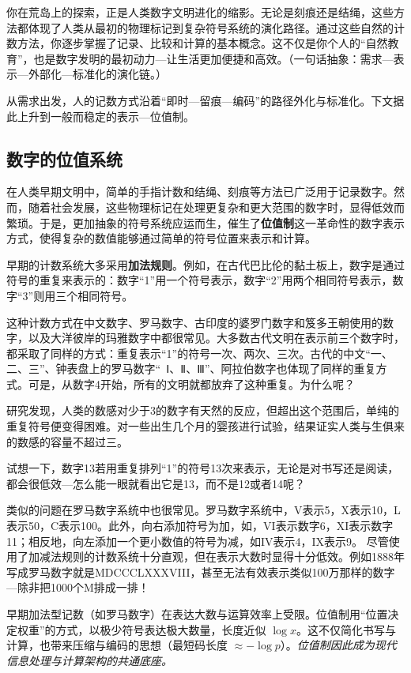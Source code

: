 你在荒岛上的探索，正是人类数字文明进化的缩影。无论是刻痕还是结绳，这些方法都体现了人类从最初的物理标记到复杂符号系统的演化路径。通过这些自然的计数方法，你逐步掌握了记录、比较和计算的基本概念。这不仅是你个人的“自然教育”，也是数字发明的最初动力---让生活更加便捷和高效。{（一句话抽象：需求—表示—外部化—标准化的演化链。）}

从需求出发，人的记数方式沿着“即时—留痕—编码”的路径外化与标准化。下文据此上升到一般而稳定的表示---位值制。

\subsection{数字的位值系统}
在人类早期文明中，简单的手指计数和结绳、刻痕等方法已广泛用于记录数字。然而，随着社会发展，这些物理标记在处理更复杂和更大范围的数字时，显得低效而繁琐。于是，更加抽象的符号系统应运而生，催生了{\bf 位值制}这一革命性的数字表示方式，使得复杂的数值能够通过简单的符号位置来表示和计算。

早期的计数系统大多采用{\bf 加法规则}。例如，在古代巴比伦的黏土板上，数字是通过符号的重复来表示的：数字“1”用一个符号表示，数字“2”用两个相同符号表示，数字“3”则用三个相同符号。

这种计数方式在中文数字、罗马数字、古印度的婆罗门数字和笈多王朝使用的数字，以及大洋彼岸的玛雅数字中都很常见。大多数古代文明在表示前三个数字时，都采取了同样的方式：重复表示“1”的符号一次、两次、三次。古代的中文“一、二、三”、钟表盘上的罗马数字“~Ⅰ、Ⅱ、Ⅲ”、阿拉伯数字也体现了同样的重复方式。可是，从数字4开始，所有的文明就都放弃了这种重复。为什么呢？

研究发现，人类的数感对少于3的数字有天然的反应，但超出这个范围后，单纯的重复符号便变得困难。对一些出生几个月的婴孩进行试验，结果证实人类与生俱来的数感的容量不超过三。

试想一下，数字13若用重复排列“1”的符号13次来表示，无论是对书写还是阅读，都会很低效---怎么能一眼就看出它是13，而不是12或者14呢？

类似的问题在罗马数字系统中也很常见。罗马数字系统中，V表示5，X表示10，L表示50，C表示100。此外，向右添加符号为加，如，VI表示数字6，XI表示数字11；相反地，向左添加一个更小数值的符号为减，如IV表示4，IX表示9。
尽管使用了加减法规则的计数系统十分直观，但在表示大数时显得十分低效。例如1888年写成罗马数字就是MDCCCLXXXVIII，甚至无法有效表示类似100万那样的数字---除非把1000个M排成一排！

早期加法型记数（如罗马数字）在表达大数与运算效率上受限。位值制用“位置决定权重”的方式，以极少符号表达极大数量，长度近似 $\log x$。这不仅简化书写与计算，也带来压缩与编码的思想（最短码长度 $\approx-\log p$）。\emph{位值制因此成为现代信息处理与计算架构的共通底座。}


